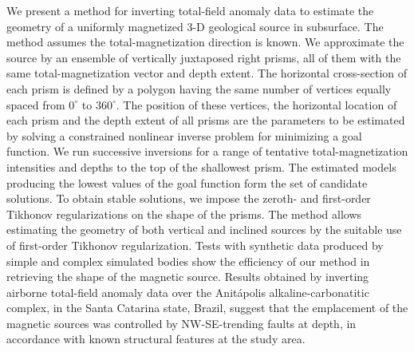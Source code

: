 \begin{summary}
We present a method for inverting total-field anomaly data to estimate the geometry of 
a uniformly magnetized 3-D geological source in subsurface. The method assumes 
the total-magnetization direction is known. We approximate the source by an 
ensemble of vertically juxtaposed right prisms, all of them with the same 
total-magnetization vector and depth extent. The horizontal cross-section 
of each prism is defined by a polygon having the same number of vertices 
equally spaced from $0^{\circ}$ to $360^{\circ}$. The position of these 
vertices, the horizontal location of each prism and the depth extent of all prisms 
are the parameters to be estimated by solving a constrained nonlinear inverse problem 
for minimizing a goal function. 
We run successive inversions for a range of tentative total-magnetization intensities 
and depths to the top of the shallowest prism. The estimated models producing 
the lowest values of the goal function form the set of candidate solutions.
To obtain stable solutions, we impose the zeroth- and first-order Tikhonov 
regularizations on the shape of the prisms. The method allows estimating the geometry 
of both vertical and inclined sources by the suitable use of first-order Tikhonov 
regularization. Tests with synthetic data produced by simple and complex simulated 
bodies show the efficiency of our method in retrieving the shape of the magnetic 
source. Results obtained by inverting airborne total-field anomaly data over the 
Anit{\'a}polis alkaline-carbonatitic complex, in the Santa Catarina state, Brazil, 
suggest that the emplacement of the magnetic sources was controlled by NW-SE-trending 
faults at depth, in accordance with known structural features at the study area.
\end{summary}